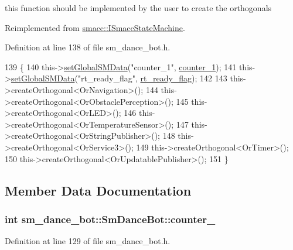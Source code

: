 this function should be implemented by the user to create the orthogonals 



Reimplemented from \hyperlink{classsmacc_1_1ISmaccStateMachine_ac2982c6c8283663e5e1e8a7c82f511ec}{smacc\+::\+I\+Smacc\+State\+Machine}.



Definition at line 138 of file sm\+\_\+dance\+\_\+bot.\+h.


\begin{DoxyCode}
139     \{
140         this->\hyperlink{classsmacc_1_1ISmaccStateMachine_a8588f9e580fbb95b53e2bd2ca3ff1f98}{setGlobalSMData}(\textcolor{stringliteral}{"counter\_1"}, \hyperlink{structsm__dance__bot_1_1SmDanceBot_ab3b8db557ce94d34c60b291911eb140c}{counter\_1});
141         this->\hyperlink{classsmacc_1_1ISmaccStateMachine_a8588f9e580fbb95b53e2bd2ca3ff1f98}{setGlobalSMData}(\textcolor{stringliteral}{"rt\_ready\_flag"}, \hyperlink{structsm__dance__bot_1_1SmDanceBot_a0f0587a13670ad8925555cd8f6cb6b2d}{rt\_ready\_flag});
142 
143         this->createOrthogonal<OrNavigation>();
144         this->createOrthogonal<OrObstaclePerception>();
145         this->createOrthogonal<OrLED>();
146         this->createOrthogonal<OrTemperatureSensor>();
147         this->createOrthogonal<OrStringPublisher>();
148         this->createOrthogonal<OrService3>();
149         this->createOrthogonal<OrTimer>();
150         this->createOrthogonal<OrUpdatablePublisher>();
151     \}
\end{DoxyCode}


\subsection{Member Data Documentation}
\subsubsection[{\texorpdfstring{counter\+\_\+1}{counter_1}}]{\setlength{\rightskip}{0pt plus 5cm}int sm\+\_\+dance\+\_\+bot\+::\+Sm\+Dance\+Bot\+::counter\+\_}\hypertarget{structsm__dance__bot_1_1SmDanceBot_ab3b8db557ce94d34c60b291911eb140c}{}\label{structsm__dance__bot_1_1SmDanceBot_ab3b8db557ce94d34c60b291911eb140c}


Definition at line 129 of file sm\+\_\+dance\+\_\+bot.\+h.

